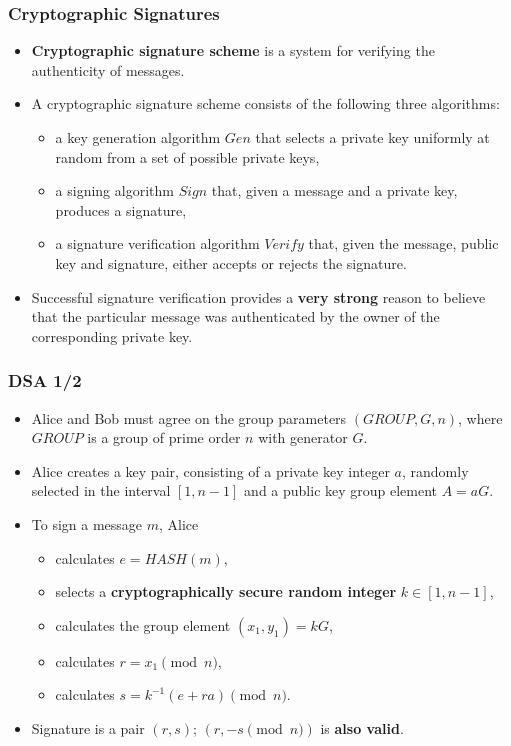 \documentclass{beamer}
\begin{document}
\begin{frame}
  \frametitle{Cryptographic Signatures}
  \begin{itemize}
  \item \textbf{Cryptographic signature scheme} is a system for verifying the
    authenticity of messages.
  \item A cryptographic signature scheme consists of the following three
    algorithms:
    \begin{itemize}
    \item a key generation algorithm $Gen$ that selects a private key uniformly
      at random from a set of possible private keys,
    \item a signing algorithm $Sign$ that, given a message and a private key,
      produces a signature,
    \item a signature verification algorithm $Verify$ that, given the message,
      public key and signature, either accepts or rejects the signature.
    \end{itemize}
  \item Successful signature verification provides a \textbf{very strong} reason
    to believe that the particular message was authenticated by the owner of the
    corresponding private key.
  \end{itemize}
\end{frame}

\begin{frame}
  \frametitle{DSA 1/2}
  \begin{itemize}
  \item Alice and Bob must agree on the group parameters $(GROUP, G, n)$, where
    $GROUP$ is a group of prime order $n$ with generator $G$.
  \item Alice creates a key pair, consisting of a private key integer $a$,
    randomly selected in the interval $[1, n - 1]$ and a public key group
    element $A = aG$.
  \item To sign a message $m$, Alice
    \begin{itemize}
    \item calculates $e = HASH(m)$,
    \item selects a \textbf{cryptographically secure random integer}
      $k \in [1, n - 1]$,
    \item calculates the group element $(x_1, y_1) = kG$,
    \item calculates $r = x_1 \pmod{n}$,
    \item calculates $s = k^{-1}(e + ra) \pmod{n}$.
    \end{itemize}
  \item Signature is a pair $(r, s)$; $(r, -s \pmod{n})$ is \textbf{also valid}.
  \end{itemize}
\end{frame}
\end{document}

